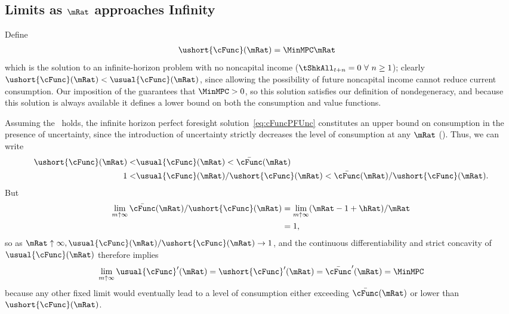 \documentclass[BufferStockTheory]{subfiles}
\begin{document}
\renewcommand{\figFile}{cGroTargetFig}
\hypertarget{\figFile}{}


\hypertarget{LimitsAsmtToInfty}{}
\subsection{Limits as \texorpdfstring{$\mRat$}{m} approaches Infinity}\label{subsec:LimitsAsmtToInfty}

Define
\begin{align*}
  \ushort{\cFunc}(\mRat)  & = \MinMPC \mRat
\end{align*}
which is the solution to an infinite-horizon problem with no noncapital income ($\tShkAll_{t+n} = 0~\forall~n\geq1$); clearly $\ushort{\cFunc}(\mRat) < \usual{\cFunc}(\mRat)$, since allowing the possibility of future noncapital income cannot reduce current consumption.  Our imposition of the {\RIC} guarantees that $\MinMPC > 0$, so this solution satisfies our definition of nondegeneracy, and because this solution is always available it defines a lower bound on both the consumption and value functions.%

Assuming the \FHWC~holds, the infinite horizon perfect foresight solution~\eqref{eq:cFuncPFUnc} constitutes an upper bound on consumption in the presence of uncertainty, since the introduction of uncertainty strictly decreases the level of consumption at any $\mRat$ (\cite{ckConcavity}).  Thus, we can write
\begin{align}
  \ushort{\cFunc}(\mRat) < & \usual{\cFunc}(\mRat)  < \bar{\cFunc}(\mRat) \label{eq:lowerltupper} \\
  1 < & \usual{\cFunc}(\mRat)/\ushort{\cFunc}(\mRat)  < \bar{\cFunc}(\mRat)/\ushort{\cFunc}(\mRat). \nonumber
\end{align}
But
\begin{align*}  \label{eq:limitlowerupper}
  \lim_{m \uparrow \infty} \bar{\cFunc}(\mRat)/\ushort{\cFunc}(\mRat)
  & = \lim_{m \uparrow \infty} (\mRat -1+ \hRat)/\mRat  \\
  & = 1,
\end{align*}
so as $\mRat \uparrow \infty, \usual{\cFunc}(\mRat)/\ushort{\cFunc}(\mRat)
\rightarrow 1$, and the continuous differentiability and strict
concavity of $\usual{\cFunc}(\mRat)$ therefore implies
\begin{equation*}  \label{eq:limxtoinftycp}
  \lim_{m \uparrow \infty} \usual{\cFunc}^{\prime}(\mRat) =
  \ushort{\cFunc}^{\prime}(\mRat) = \bar{\cFunc}^{\prime}(\mRat) = \MinMPC
\end{equation*}
because any other fixed limit would eventually lead to a level of
consumption either exceeding $\bar{\cFunc}(\mRat)$ or lower than
$\ushort{\cFunc}(\mRat)$.
\end{document}
